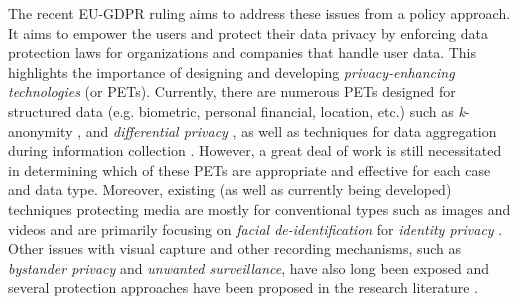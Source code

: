 The recent EU-GDPR ruling aims to address these issues from a policy approach. It aims to empower the users and protect their data privacy by enforcing data protection laws for organizations and companies that handle user data. This highlights the importance of designing and developing \textit{privacy-enhancing technologies} (or PETs). %
Currently, there are numerous PETs designed for structured data (e.g. biometric, personal financial, location, etc.) such as \textit{k}-anonymity \cite{sweeney2002k}, and \textit{differential privacy} \cite{mcsherry2007mechanism, dwork2014algorithmic, erlingsson2014rappor}, as well as techniques for data aggregation during information collection \cite{he2007pda, he2011pda}. However, a great deal of work is still necessitated in determining which of these PETs are appropriate and effective for each case and data type. Moreover, existing (as well as currently being developed) techniques protecting media are mostly for conventional types such as images and videos and are primarily focusing on \textit{facial de-identification} for \textit{identity privacy} \cite{%
gross2008semisupervised, du2014garp, brkic2017generative, wu2018privacy}. Other issues with visual capture and other recording mechanisms, such as \textit{bystander privacy} and \textit{unwanted surveillance}, have also long been exposed \cite{acquisti2011, zarepour2016context} and several protection approaches have been proposed in the research literature \cite{deguzman2018security}.



